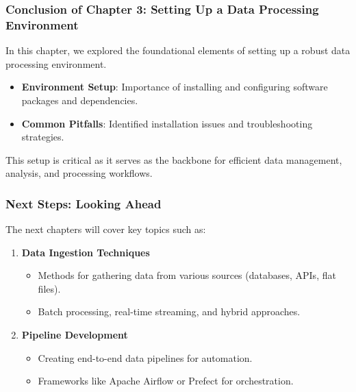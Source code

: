 \documentclass{beamer}
\begin{document}
\begin{frame}[fragile]
    \frametitle{Conclusion of Chapter 3: Setting Up a Data Processing Environment}
    In this chapter, we explored the foundational elements of setting up a robust data processing environment. 

    \begin{itemize}
        \item \textbf{Environment Setup}: Importance of installing and configuring software packages and dependencies.
        \item \textbf{Common Pitfalls}: Identified installation issues and troubleshooting strategies.
    \end{itemize}

    This setup is critical as it serves as the backbone for efficient data management, analysis, and processing workflows.
\end{frame}

\begin{frame}[fragile]
    \frametitle{Next Steps: Looking Ahead}
    The next chapters will cover key topics such as:

    \begin{enumerate}
        \item \textbf{Data Ingestion Techniques}
            \begin{itemize}
                \item Methods for gathering data from various sources (databases, APIs, flat files).
                \item Batch processing, real-time streaming, and hybrid approaches.
            \end{itemize}
        \item \textbf{Pipeline Development}
            \begin{itemize}
                \item Creating end-to-end data pipelines for automation.
                \item Frameworks like Apache Airflow or Prefect for orchestration.
            \end{itemize}
    \end{enumerate}
\end{frame}
\end{document}

